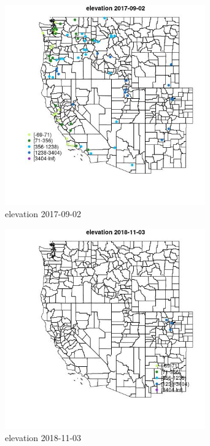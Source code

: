 \begin{figure} 
\centering  
\includegraphics[width=0.77\textwidth]{Code_Outputs/Report_ML_input_PM25_Step4_part_e_de_duplicated_aveswNAs_MapObselevation2017-09-02.jpg} 
\caption{\label{fig:Report_ML_input_PM25_Step4_part_e_de_duplicated_aveswNAsMapObselevation2017-09-02}elevation 2017-09-02} 
\end{figure} 
 

\begin{figure} 
\centering  
\includegraphics[width=0.77\textwidth]{Code_Outputs/Report_ML_input_PM25_Step4_part_e_de_duplicated_aveswNAs_MapObselevation2018-11-03.jpg} 
\caption{\label{fig:Report_ML_input_PM25_Step4_part_e_de_duplicated_aveswNAsMapObselevation2018-11-03}elevation 2018-11-03} 
\end{figure} 
 


